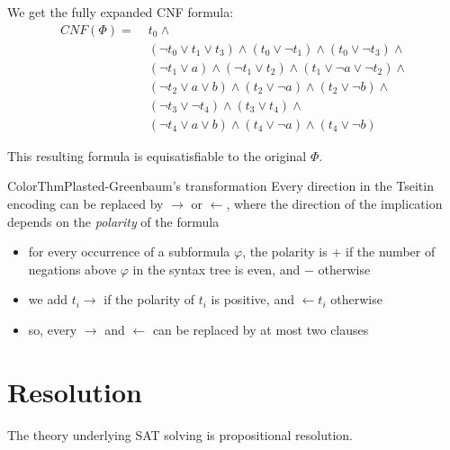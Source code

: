 \documentclass[a4paper, 11pt]{report}
\begin{document}
We get the fully expanded CNF formula:
\begin{align*}
CNF(\Phi) =\; & t_0 \land \\
& (\neg t_0 \lor t_1 \lor t_3) \land (t_0 \lor \neg t_1) \land (t_0 \lor \neg t_3) \land \\
& (\neg t_1 \lor a) \land (\neg t_1 \lor t_2) \land (t_1 \lor \neg a \lor \neg t_2) \land \\
& (\neg t_2 \lor a \lor b) \land (t_2 \lor \neg a) \land (t_2 \lor \neg b) \land \\
& (\neg t_3 \lor \neg t_4) \land (t_3 \lor t_4) \land \\
& (\neg t_4 \lor a \lor b) \land (t_4 \lor \neg a) \land (t_4 \lor \neg b)
\end{align*}

This resulting formula is equisatisfiable to the original $\Phi$.


\begin{cframe}{ColorThm}{Plasted-Greenbaum's transformation}
 Every direction in the Tseitin encoding can be replaced by $\to $ or $\leftarrow $, where the direction of the implication depends on the \textit{polarity} of the formula
        \begin{itemize}
            \item for every occurrence of a subformula $\varphi$, the polarity is $+$ if the number of negations above $\varphi$ in the syntax tree is even, and $-$ otherwise
            \item we add $t_{i} \to $ if the polarity of $t_{i}$ is positive, and $\leftarrow t_{i}$ otherwise
            \item so, every $\to $ and $\leftarrow $ can be replaced by at most two clauses
        \end{itemize}
\end{cframe}

\section{Resolution}
The theory underlying SAT solving is propositional resolution.
\end{document}
